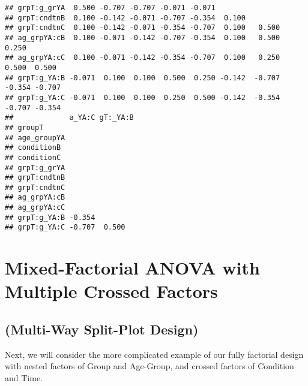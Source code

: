 \documentclass[]{article}
\begin{document}
\begin{verbatim}
## grpT:g_grYA  0.500 -0.707 -0.707 -0.071 -0.071                             
## grpT:cndtnB  0.100 -0.142 -0.071 -0.707 -0.354  0.100                      
## grpT:cndtnC  0.100 -0.142 -0.071 -0.354 -0.707  0.100   0.500              
## ag_grpYA:cB  0.100 -0.071 -0.142 -0.707 -0.354  0.100   0.500  0.250       
## ag_grpYA:cC  0.100 -0.071 -0.142 -0.354 -0.707  0.100   0.250  0.500  0.500
## grpT:g_YA:B -0.071  0.100  0.100  0.500  0.250 -0.142  -0.707 -0.354 -0.707
## grpT:g_YA:C -0.071  0.100  0.100  0.250  0.500 -0.142  -0.354 -0.707 -0.354
##             a_YA:C gT:_YA:B
## groupT                     
## age_groupYA                
## conditionB                 
## conditionC                 
## grpT:g_grYA                
## grpT:cndtnB                
## grpT:cndtnC                
## ag_grpYA:cB                
## ag_grpYA:cC                
## grpT:g_YA:B -0.354         
## grpT:g_YA:C -0.707  0.500
\end{verbatim}

\hypertarget{mixed-factorial-anova-with-multiple-crossed-factors}{%
\section{Mixed-Factorial ANOVA with Multiple Crossed
Factors}\label{mixed-factorial-anova-with-multiple-crossed-factors}}

\hypertarget{multi-way-split-plot-design}{%
\subsection{(Multi-Way Split-Plot
Design)}\label{multi-way-split-plot-design}}

Next, we will consider the more complicated example of our fully
factorial design with nested factors of Group and Age-Group, and crossed
factors of Condition and Time.
\end{document}
